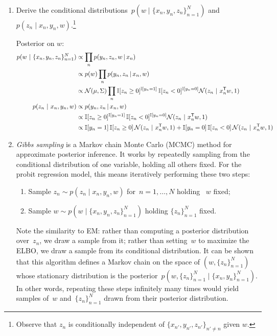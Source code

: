 \begin{enumerate}[label=(\alph*)]
\begin{solution}
\end{solution}


\clearpage
\item Derive the conditional distributions~$p(w \mid \{x_n, y_n, z_n\}_{n=1}^N)$ and~$p(z_n \mid x_n, y_n, w)$.\footnote{Observe that $z_n$ is conditionally independent of $\{x_{n'}, y_{n'}, z_{n'}\}_{n' \neq n}$ given $w$.}

\begin{solution}
Posterior on $w$:
\begin{align*}
    p(w ~\vert~ \{x_n, y_n, z_n\}_{n=1}^N)
        &\propto \prod_n p(y_n, z_n, w \,|\, x_n) \\
        &\propto p(w) \prod_n p(y_n, z_n \,|\, x_n, w) \\
        &\propto \mathcal{N}(\mu, \Sigma)
            \prod_n
                \mathbb{I}[z_n \geq 0]^{\mathbb{I}[y_n = 1]} \,
                \mathbb{I}[z_n < 0]^{\mathbb{I}[y_n = 0]}
                \mathcal{N}(z_n ~\vert~ x_n^{\mathsf{T}} w, 1) \\
    p(z_n ~\vert~ x_n, y_n, w) 
        &\propto p(y_n, z_n \,|\, x_n, w) \\
        &\propto \mathbb{I}[z_n \geq 0]^{\mathbb{I}[y_n = 1]} \,
                \mathbb{I}[z_n < 0]^{\mathbb{I}[y_n = 0]}
                \mathcal{N}(z_n ~\vert~ x_n^{\mathsf{T}} w, 1) \\
        &\propto \mathbb{I}[y_n = 1]\,\mathbb{I}[z_n \geq 0] \,
            \mathcal{N}(z_n ~\vert~ x_n^{\mathsf{T}} w, 1)
            + \mathbb{I}[y_n = 0]\,\mathbb{I}[z_n < 0] \,
            \mathcal{N}(z_n ~\vert~ x_n^{\mathsf{T}} w, 1)
\end{align*}

\end{solution}

\item \emph{Gibbs sampling} is a Markov chain Monte Carlo (MCMC) method for approximate posterior inference.  It works by repeatedly sampling from the conditional distribution of one variable, holding all others fixed.  For the probit regression model, this means iteratively performing these two steps:
\begin{enumerate}[label=\arabic*.]
    \item Sample $z_n \sim p(z_n \mid x_n, y_n, w)$ for~$n = 1, \ldots, N$ holding ~$w$ fixed;
    \item Sample $w \sim p(w \mid \{x_n, y_n, z_n\}_{n=1}^N)$ holding $\{z_n\}_{n=1}^N$ fixed.
\end{enumerate}
Note the similarity to EM: rather than computing a posterior distribution over~$z_n$, we draw a sample from it; rather than setting~$w$ to maximize the ELBO, we draw a sample from its conditional distribution.  It can be shown that this algorithm defines a Markov chain on the space of $(w, \{z_n\}_{n=1}^N)$ whose stationary distribution is the posterior~$p(w, \{z_n\}_{n=1}^N \mid \{x_n, y_n\}_{n=1}^N)$.  In other words, repeating these steps infinitely many times would yield samples of~$w$ and~$\{z_n\}_{n=1}^N$ drawn from their posterior distribution. 


\end{enumerate}
